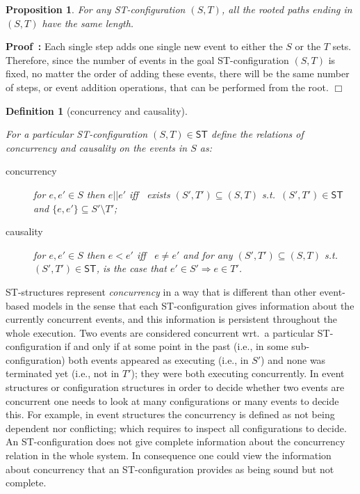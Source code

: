 \documentclass[submission,copyright,creativecommons]{eptcs}
\newtheorem{proposition}[theorem]{Proposition}
\newtheorem{definition}[theorem]{Definition}
\newenvironment{proof}[1][\!\!\,]{\vspace{1ex}\noindent\textbf{Proof #1: }}{\hfill$\Box$\vspace{2ex}}
\newcounter{case}
\newcommand\ST{\ensuremath{\mathsf{ST}}}
\newcommand\concurr{\ensuremath{||}}
\newcommand\causes{\ensuremath{<}}
\begin{document}
\begin{proposition}\label{prop_pathsEqualLength}
For any ST-configuration $(S,T)$, all the rooted paths ending in  $(S,T)$ have the same length.
\end{proposition}

\begin{proof}
Each single step adds one single new event to either the $S$ or the $T$ sets. Therefore, since the number of events in the goal ST-configuration $(S,T)$ is fixed, no matter the order of adding these events, there will be the same number of steps, or event addition operations, that can be performed from the root.
\end{proof}


\begin{definition}[concurrency and causality]\label{def_ConcCausal}\ 

For a particular ST-configuration $(S,T)\in\ST$ define the relations of \emph{concurrency} and \emph{causality} on the events in $S$ as:
\begin{description}
\item[concurrency] for $e,e'\!\in\!S$ then $e\concurr e'$ iff \, exists $(S',T')\!\subseteq\!(S,T)$ s.t.\ $(S',T')\!\in\!\ST$ and $\{e,e'\}\!\subseteq\!S'\setminus T'$;
\item[causality] for $e,e'\!\in\!S$ then $e\!\causes\!e'$ iff \, $e\!\neq\!e'$ and for any $(S',T')\!\subseteq\!(S,T)$ s.t.\ $(S',T')\!\in\!\ST$, is the case that $e'\!\in\!S'\Rightarrow e\!\in\!T'$.
 \end{description}
\end{definition}

ST-structures represent \textit{concurrency} in a way that is different than other event-based models in the sense that each ST-configuration gives information about the currently concurrent events, and this information is persistent throughout the whole execution.
Two events are considered concurrent wrt.\ a particular ST-configuration if and only if at some point in the past (i.e., in some sub-configuration) both events appeared as executing (i.e., in $S'$) and none was terminated yet (i.e., not in $T'$); they were both executing concurrently.
In event structures or configuration structures in order to decide whether two events are concurrent one needs to look at many configurations or many events to decide this. For example, in event structures the concurrency is defined as not being dependent nor conflicting; which requires to inspect all configurations to decide.
An ST-configuration does not give complete information about the concurrency relation in the whole system. In consequence one could view the information about concurrency that an ST-configuration provides as being sound but not complete.
\end{document}
